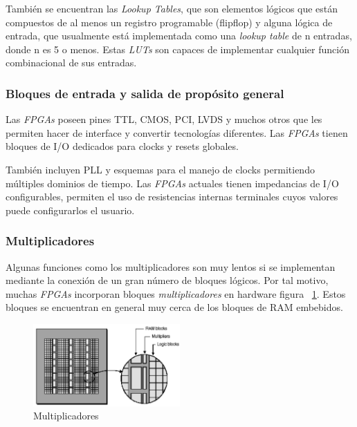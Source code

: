 También se encuentran las \textit{Lookup Tables}, que son elementos
lógicos que están compuestos de al menos un registro programable
(flip\-flop) y alguna lógica de entrada, que usualmente está
implementada como una \textit{lookup table} de n entradas, donde n es
5 o menos. Estas \textit{LUTs} son capaces de implementar cualquier
función combinacional de sus entradas.

\subsubsection{Bloques de entrada y salida de propósito general}

Las \textit{FPGAs} poseen pines TTL, CMOS, PCI, LVDS y muchos otros
que les permiten hacer de interface y convertir tecnologías
diferentes. Las \textit{FPGAs} tienen bloques de I/O dedicados para
clocks y resets globales.
	
También incluyen PLL y esquemas para el manejo de clocks permitiendo
múltiples dominios de tiempo. Las \textit{FPGAs} actuales tienen
impedancias de I/O configurables, permiten el uso de resistencias
internas terminales cuyos valores puede configurarlos el
usuario.

\subsubsection{Multiplicadores}

Algunas funciones como los multiplicadores son muy lentos si se
implementan mediante la conexión de un gran número de bloques
lógicos. Por tal motivo, muchas \textit{FPGAs} incorporan bloques
\textit{multiplicadores} en hardware figura ~\ref{fig:mult}. Estos
bloques se encuentran en general muy cerca de los bloques de RAM
embebidos.

\begin{figure}[h!]
\begin{center}
\includegraphics[width=0.5\textwidth,keepaspectratio=true]{./images/multram}
\caption{Multiplicadores}
\label{fig:mult}
\end{center}
\end{figure}


